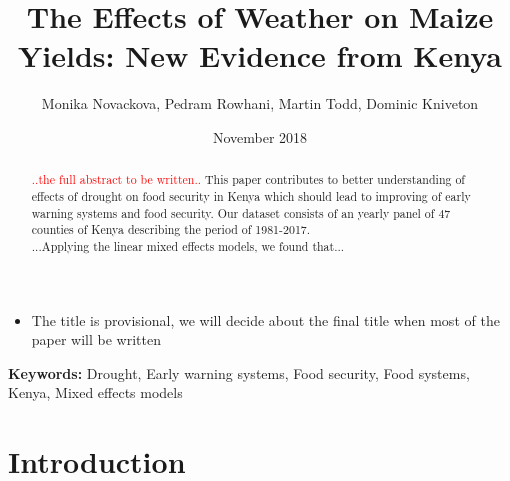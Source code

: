\documentclass[a4paper,12pt]{article}
\date{\normalsize{November 2018}}
\title{\Large \bf The Effects of Weather on Maize Yields: New Evidence from Kenya}
\author{Monika Novackova, Pedram Rowhani, Martin Todd, Dominic Kniveton}
\affil{\small{Department of Geography, University of Sussex, Falmer, UK}}
\begin{document}
  

\makeatletter
\def\hlinewd#1{%
\noalign{\ifnum0=`}\fi\hrule \@height #1 %
\futurelet\reserved@a\@xhline}
\makeatother

\maketitle
\vfill
{}
\doublespacing

\begin{itemize}
\color{blue}
\item The title is provisional, we will decide about the final title when most of the paper will be written
\end{itemize}



\begin{abstract}
\noindent \textcolor{red}{..the full abstract to be written..} This paper contributes to better understanding of effects of drought on food security in Kenya which should lead to improving of early warning systems and food security. Our dataset consists of an yearly panel of $47$ counties of Kenya describing the period of 1981-2017.
\\
...Applying the linear mixed effects models, we found that...
\end{abstract}



\noindent \textbf{Keywords:}  Drought, Early warning systems, Food security, Food systems, Kenya, Mixed effects models\\




\newpage
\sloppy


\section{Introduction}\label{Introduction}
\end{document}

